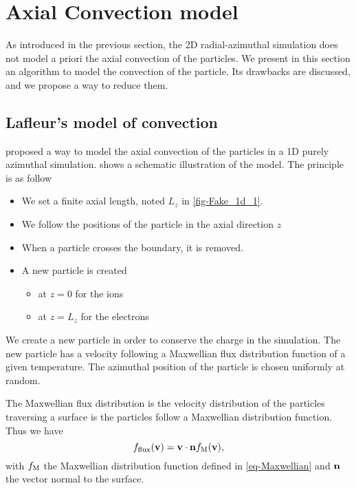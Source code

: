 
\section{Axial Convection model}
  \label{sec-reinjectionnoise}

  As introduced in the previous section, the \ac{2D} radial-azimuthal simulation does not model a priori the axial convection of the particles.
  We present in this section an algorithm to model the convection of the particle.
  Its drawbacks are discussed, and we propose a way to reduce them.
  
  \subsection{Lafleur's model of convection}

    \citet{lafleur2016a} proposed a way to model the axial convection of the particles in a \ac{1D} purely azimuthal simulation.
     shows a schematic illustration of the model.
    The principle is as follow
    \begin{itemize}
      \item We set a finite axial length, noted $L_z$ in \cref{fig-Fake_1d_1}.
      \item We follow the positions of the particle in the axial direction $z$
      \item When a particle crosses the boundary, it is removed.
      \item A new particle is created
      \begin{itemize}
        \item at $z=0$ for the ions
        \item  at $z=L_z$ for the electrons
      \end{itemize}
    \end{itemize}

    We create a new particle in order to conserve the charge in the simulation.
    The new particle has a velocity following a Maxwellian flux distribution function of a given temperature.
    The azimuthal position of the particle is chosen uniformly at random.

    The Maxwellian flux distribution is the velocity distribution of the particles traversing a surface is the particles follow a Maxwellian distribution function. Thus we have
    \begin{equation} \label{eq-Maxwflux} 
      f_{\rm flux}({\mathbf v}) = {\mathbf v} \cdot {\mathbf n} f_{\rm M}({\mathbf v}),
    \end{equation}
    with $f_{\rm M}$ the Maxwellian distribution function defined in \cref{eq-Maxwellian} and ${\mathbf n}$ the vector normal to the surface.


